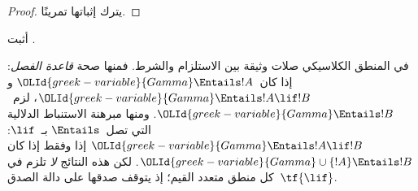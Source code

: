 \documentclass[../../../include/open-logic-section]{subfiles}
\begin{document}
\begin{proof}
يترك إثباتها تمرينًا.
\end{proof}

\begin{prob}
أثبت .
\end{prob}

في المنطق الكلاسيكي صلات وثيقة بين الاستلزام والشرط. فمنها صحة
\emph{قاعدة الفصل}: إذا كان~$\OLId{greek-variable}{Gamma} \Entails !A$ و
$\OLId{greek-variable}{Gamma} \Entails !A \lif !B$، لزم~$\OLId{greek-variable}{Gamma} \Entails !B$.
ومنها مبرهنة الاستنباط الدلالية التي تصل~$\Entails$ بـ~$\lif$:
$\OLId{greek-variable}{Gamma} \Entails !A \lif !B$ إذا وفقط إذا كان
$\OLId{greek-variable}{Gamma} \cup \{!A\} \Entails !B$. لكن هذه النتائج \emph{لا} تلزم
في كل منطق متعدد القيم؛ إذ يتوقف صدقها على دالة الصدق~$\tf{\lif}$.
\end{document}
